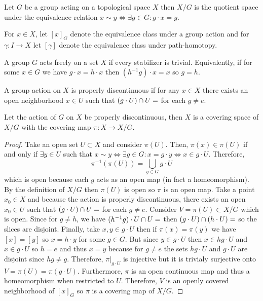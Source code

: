 \documentclass[12pt]{extarticle}
\begin{document}
\begin{definition}
Let $G$ be a group acting on a topological space $X$ then $X/G$ is the quotient space under the equivalence relation $x \sim y \iff \exists g \in G : g \cdot x = y$. 
\end{definition}

\begin{remark}
For $x \in X$, let $[x]_G$ denote the equivalence class under a group action and for $\gamma : I \to X$ let $[\gamma]$ denote the equivalence class under path-homotopy. 
\end{remark}

\begin{definition}
A group $G$ acts freely on a set $X$ if every stabilizer is trivial. Equivalently, if for some $x \in G$ we have $g \cdot x = h \cdot x$ then $(h^{-1}g) \cdot x = x$ so $g = h$. 
\end{definition}

\begin{definition}
A group action on $X$ is properly discontinuous if for any $x \in X$ there exists an open neighborhood $x \in U$ such that $(g \cdot U) \cap U = \empty$ for each $g \neq e$. 
\end{definition}

\begin{lemma}
Let the action of $G$ on $X$ be properly discontinuous, then $X$ is a covering space of $X/G$ with the covering map $\pi : X \to X/G$.
\end{lemma}

\begin{proof}
Take an open set $U \subset X$ and consider $\pi(U)$. Then, $\pi(x) \in \pi(U)$ if and only if $\exists y \in U$ such that $x \sim y \iff \exists g \in G : x = g \cdot y \iff x \in g \cdot U$. Therefore,
\[\pi^{-1}(\pi(U))  = \bigcup_{g \in G} g \cdot U\] which is open because each $g$ acts as an open map (in fact a homeomorphism). By the definition of $X/G$ then $\pi(U)$ is open so $\pi$ is an open map. Take a point $x_0 \in X$ and because the action is properly discontinuous, there exists an open $x_0 \in U$ such that $(g \cdot U) \cap U = \empty$ for each $g \neq e$. Consider $V = \pi(U) \subset X/G$ which is open. Since for $g \neq h$, we have $(h^{-1} g) \cdot U \cap U = \empty$ then $(g \cdot U) \cap (h \cdot U) = \empty$ so the slices are disjoint. Finally, take $x, y \in g \cdot U$ then if $\pi(x) = \pi(y)$ we have $[x] = [y]$ so $x = h \cdot y$ for some $g \in G$. But since $y \in g \cdot U$ then $x \in hg \cdot U$ and $x \in g \cdot U$ so $h = e$ and thus $x = y$ because for $g \neq e$ the sets $hg \cdot U$ and $g \cdot U$ are disjoint since $hg \neq g$. Therefore, $\pi|_{g \cdot U}$ is injective but it is trivialy surjective onto $V = \pi(U) = \pi(g \cdot U)$. Furthermore, $\pi$ is an open continuous map and thus a homeomorphism when restricted to $U$. Therefore, $V$ is an openly covered neighborhood of $[x]_G$ so $\pi$ is a covering map of $X/G$.  
\end{proof}
\end{document}
